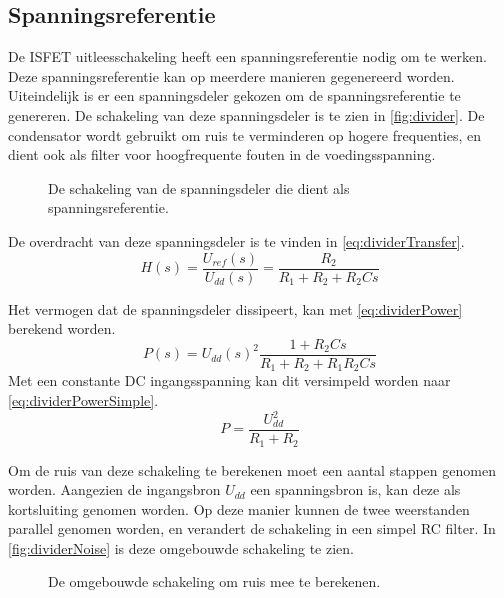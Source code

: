 \subsection{Spanningsreferentie}

De ISFET uitleesschakeling heeft een spanningsreferentie nodig om te werken. Deze spanningsreferentie kan op meerdere manieren gegenereerd worden.
Uiteindelijk is er een spanningsdeler gekozen om de spanningsreferentie te genereren. De schakeling van deze spanningsdeler is te zien in \autoref{fig:divider}.
De condensator wordt gebruikt om ruis te verminderen op hogere frequenties, en dient ook als filter voor hoogfrequente fouten in de voedingsspanning.

\begin{figure}[ht]
    \centering
    \def\svgwidth{0.5\textwidth}
    
    \caption{De schakeling van de spanningsdeler die dient als spanningsreferentie.}
    \label{fig:divider}
\end{figure}

\noindent
De overdracht van deze spanningsdeler is te vinden in \autoref{eq:dividerTransfer}.
\begin{equation}\label{eq:dividerTransfer}
    H(s) = \frac{U_{ref}(s)}{U_{dd}(s)} = \frac{R_2}{R_1 + R_2 + R_2Cs}
\end{equation}

\noindent
Het vermogen dat de spanningsdeler dissipeert, kan met \autoref{eq:dividerPower} berekend worden.
\begin{equation}\label{eq:dividerPower}
    P(s) = U_{dd}(s)^2\frac{1+R_2Cs}{R_1 + R_2 + R_1R_2Cs}
\end{equation}
Met een constante DC ingangsspanning kan dit versimpeld worden naar \autoref{eq:dividerPowerSimple}.
\begin{equation}\label{eq:dividerPowerSimple}
    P = \frac{U_{dd}^2}{R_1 + R_2}
\end{equation}

\noindent
Om de ruis van deze schakeling te berekenen moet een aantal stappen genomen worden. Aangezien de ingangsbron $U_{dd}$ een spanningsbron is, kan deze als kortsluiting genomen worden. Op deze manier kunnen de twee weerstanden parallel genomen worden, en verandert de schakeling in een simpel RC filter. In \autoref{fig:dividerNoise} is deze omgebouwde schakeling te zien.

\begin{figure}[ht]
    \centering
    \def\svgwidth{0.35\textwidth}
    
    \caption{De omgebouwde schakeling om ruis mee te berekenen.}
    \label{fig:dividerNoise}
\end{figure}

